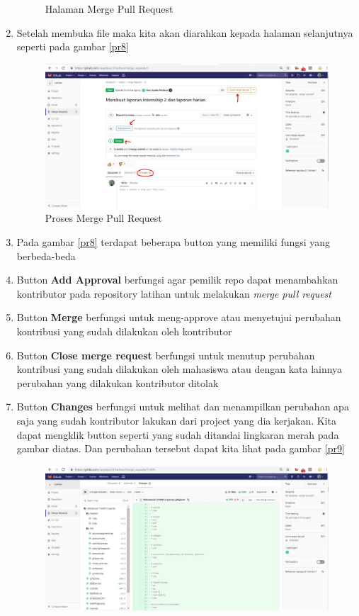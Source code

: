 \begin{enumerate}
\begin{figure}[!htbp]
\caption{Halaman Merge Pull Request}
\label{fig:pr7}
\end{figure}
\item Setelah membuka file maka kita akan diarahkan kepada halaman selanjutnya seperti pada gambar \ref{pr8}
\subitem
\begin{figure}[!htbp]
\centerline{\includegraphics[width=.75\textwidth]{Figures/gitlab/pr8.JPG}}
\caption{Proses Merge Pull Request}
\label{fig:pr8}
\end{figure}
\item Pada gambar \ref{pr8} terdapat beberapa button yang memiliki fungsi yang berbeda-beda
\item Button \textbf{Add Approval} berfungsi agar pemilik repo dapat menambahkan kontributor pada repository latihan untuk melakukan \textit{merge pull request}
\item Button \textbf{Merge} berfungsi untuk meng-approve atau menyetujui perubahan kontribusi yang sudah dilakukan oleh kontributor
\item Button \textbf{Close merge request} berfungsi untuk menutup perubahan kontribusi yang sudah dilakukan oleh mahasiswa atau dengan kata lainnya perubahan yang dilakukan kontributor ditolak
\item Button \textbf{Changes} berfungsi untuk melihat dan menampilkan perubahan apa saja yang sudah kontributor lakukan dari project yang dia kerjakan. Kita dapat mengklik button seperti yang sudah ditandai lingkaran merah pada gambar diatas. Dan perubahan tersebut dapat kita lihat pada gambar \ref{pr9}
\subitem 
\begin{figure}[!htbp]
\centerline{\includegraphics[width=.75\textwidth]{Figures/gitlab/pr9.JPG}}

\end{figure}
\end{enumerate}
